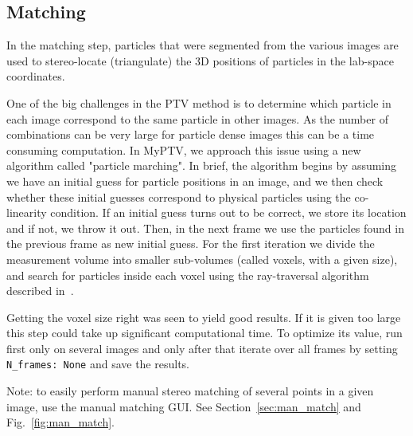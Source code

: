\documentclass[10pt,a4paper]{article}
\begin{document}
%
%








\subsection{Matching}\label{sec:workflow_match}

In the matching step, particles that were segmented from the various images are used to stereo-locate (triangulate) the 3D positions of particles in the lab-space coordinates. 



One of the big challenges in the PTV method is to determine which particle in each image correspond to the same particle in other images. As the number of combinations can be very large for particle dense images this can be a time consuming computation. In MyPTV, we approach this issue using a new algorithm called "particle marching". In brief, the algorithm begins by assuming we have an initial guess for particle positions in an image, and we then check whether these initial guesses correspond to physical particles using the co-linearity condition. If an initial guess turns out to be correct, we store its location and if not, we throw it out. Then, in the next frame we use the particles found in the previous frame as new initial guess. For the first iteration we divide the measurement volume into smaller sub-volumes (called voxels, with a given size), and search for particles inside each voxel using the ray-traversal algorithm described in~\cite{Bourgoin2020}.
     
Getting the voxel size right was seen to yield good results. If it is given too large this step could take up significant computational time. To optimize its value, run first only on several images and only after that iterate over all frames by setting \texttt{N\_frames: None} and save the results. 

Note: to easily perform manual stereo matching of several points in a given image, use the manual matching GUI. See Section~\ref{sec:man_match} and Fig.~\ref{fig:man_match}.
\end{document}
